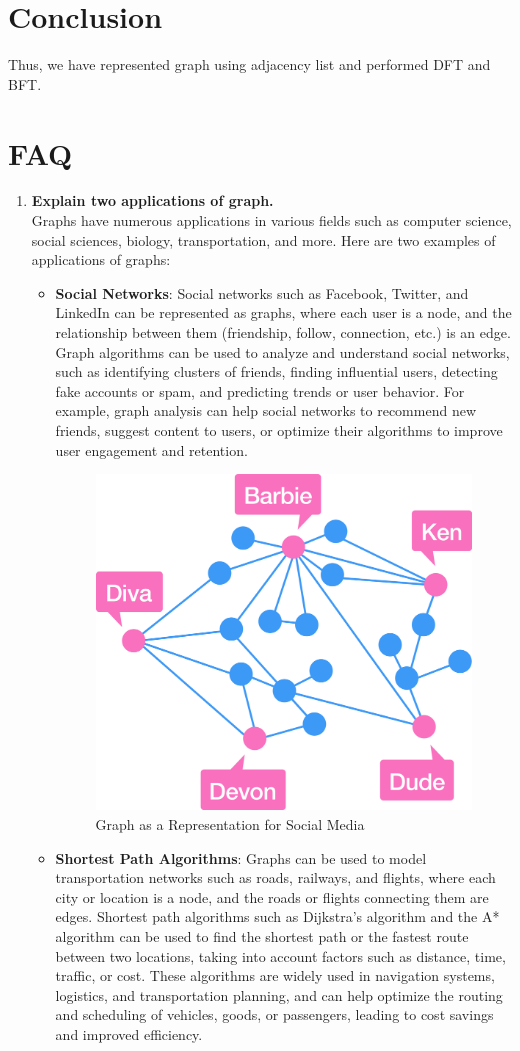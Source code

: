 \documentclass[11pt]{article}
\begin{document}
\section{Conclusion}
Thus, we have represented graph using adjacency list and performed DFT and BFT.

\clearpage

\section{FAQ}
\begin{enumerate}
\item \textbf{Explain two applications of graph.}\\

Graphs have numerous applications in various fields such as computer science, social sciences, biology, transportation, and more. Here are two examples of applications of graphs:
\begin{itemize}
    \item \textbf{Social Networks}: Social networks such as Facebook, Twitter, and LinkedIn can be represented as graphs, where each user is a node, and the relationship between them (friendship, follow, connection, etc.) is an edge. Graph algorithms can be used to analyze and understand social networks, such as identifying clusters of friends, finding influential users, detecting fake accounts or spam, and predicting trends or user behavior. For example, graph analysis can help social networks to recommend new friends, suggest content to users, or optimize their algorithms to improve user engagement and retention.

    \begin{figure}[H]
        \centering
        \includegraphics[width=.45\textwidth]{figures/social_media.png}
        \caption{Graph as a Representation for Social Media}
    \end{figure}
    
    \item \textbf{Shortest Path Algorithms}: Graphs can be used to model transportation networks such as roads, railways, and flights, where each city or location is a node, and the roads or flights connecting them are edges. Shortest path algorithms such as Dijkstra's algorithm and the A* algorithm can be used to find the shortest path or the fastest route between two locations, taking into account factors such as distance, time, traffic, or cost. These algorithms are widely used in navigation systems, logistics, and transportation planning, and can help optimize the routing and scheduling of vehicles, goods, or passengers, leading to cost savings and improved efficiency.
    

\end{itemize}
\end{enumerate}
\end{document}
